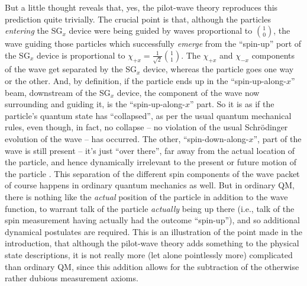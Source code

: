 \documentclass[aps,prc,onecolumn,letterpaper,floatfix,12pt]{revtex4}
\begin{document}
But a little thought reveals that, yes, the pilot-wave theory
reproduces this prediction quite trivially.  The crucial point is
that, although the particles \emph{entering} the SG$_x$ device were
being guided by waves proportional to $\binom{1}{0}$, 
the wave guiding those particles which successfully \emph{emerge} from the
``spin-up'' port of the SG$_x$ device is proportional to $\chi_{+x} =
\frac{1}{\sqrt{2}} \binom{1}{1}$.  The $\chi_{+x}$ and $\chi_{-x}$ 
components of the wave get
separated by the SG$_x$ device, whereas the particle goes one way or the
other.  And, by definition, if the particle ends up in the
``spin-up-along-$x$'' beam, downstream of the SG$_x$ device, the
component of the wave now surrounding and guiding it, is the
``spin-up-along-$x$'' part.  So it is as if the particle's quantum state
has ``collapsed'', as per the usual quantum mechanical rules,
even though, in fact, no collapse -- no violation of the usual
Schr\"odinger evolution of the wave -- has occurred.  The other,
``spin-down-along-$x$'', part of the wave is still present -- it's
just ``over there'', far away from the actual location of the
particle, and hence dynamically irrelevant to the present or future
motion of the particle \cite{future}.   This separation of the different spin
components of the wave packet of course happens in ordinary quantum
mechanics as well.  But in ordinary QM, there is nothing like the
\emph{actual} position of the particle in addition to the wave
function, to warrant talk of the particle \emph{actually} being up
there (i.e., talk of the spin measurement having actually had the
outcome ``spin-up''), and so additional dynamical postulates are
required.  This is an illustration of the point made in the
introduction, that although the pilot-wave theory adds something to
the physical state descriptions, it is not really more (let alone
pointlessly more) complicated than ordinary QM, since this addition
allows for the subtraction of the otherwise rather dubious measurement
axioms.  




\end{document}
